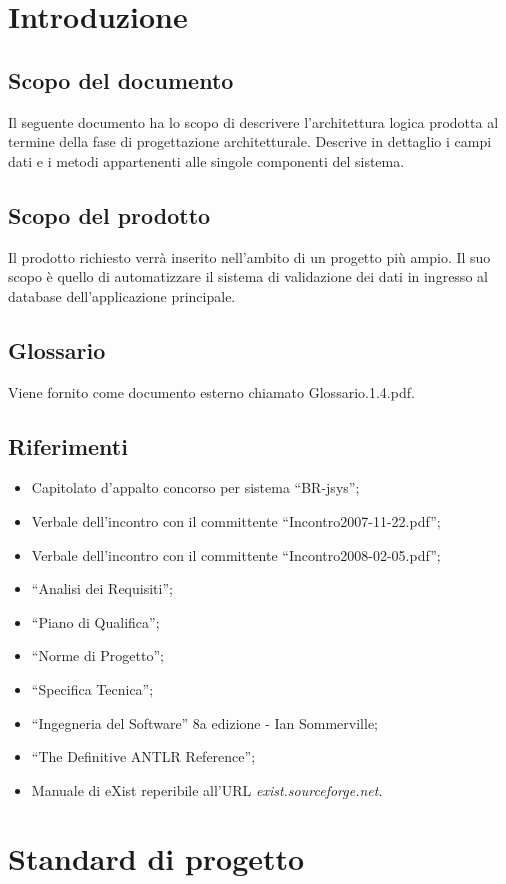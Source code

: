 \documentclass[11pt,titlepage,a4paper]{report}
\begin{document}
\tableofcontents 

\chapter{Introduzione}
\section{Scopo del documento}
Il seguente documento ha lo scopo di descrivere l'architettura logica prodotta al termine della fase di progettazione architetturale. Descrive in dettaglio i campi dati e i metodi appartenenti alle singole componenti del sistema.
\section{Scopo del prodotto}
Il prodotto richiesto verr\`a inserito nell'ambito di un progetto pi\`u ampio. Il suo scopo \`e quello di automatizzare il sistema di validazione dei dati in ingresso al database dell'applicazione principale.

\section{Glossario}
Viene fornito come documento esterno chiamato Glossario.1.4.pdf.

\section{Riferimenti}
\begin{itemize}
\item Capitolato d'appalto concorso per sistema ``BR-jsys'';
\item Verbale dell'incontro con il committente ``Incontro2007-11-22.pdf'';
\item Verbale dell'incontro con il committente ``Incontro2008-02-05.pdf'';
\item ``Analisi dei Requisiti'';
\item ``Piano di Qualifica'';
\item ``Norme di Progetto'';
\item ``Specifica Tecnica'';
\item ``Ingegneria del Software'' 8a edizione - Ian Sommerville;
\item ``The Definitive ANTLR Reference'';
\item Manuale di eXist reperibile all'URL \textit{exist.sourceforge.net}.
\end{itemize}
\chapter{Standard di progetto}
\end{document}
